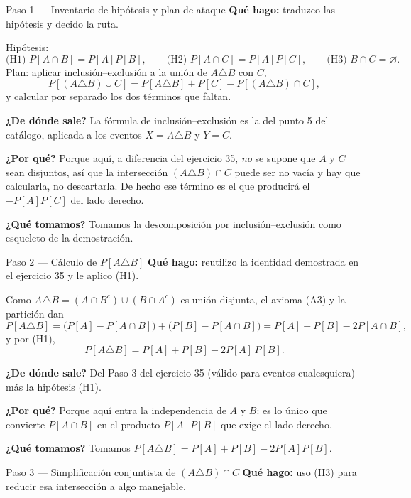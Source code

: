 \documentclass[11pt]{article}
\begin{document}
\begin{sol}

\begin{paso}{Paso 1 --- Inventario de hip\'otesis y plan de ataque}
\textbf{Qu\'e hago:} traduzco las hip\'otesis y decido la ruta.

Hip\'otesis:
\[
\text{(H1) } P[A\cap B]=P[A]P[B],
\qquad
\text{(H2) } P[A\cap C]=P[A]P[C],
\qquad
\text{(H3) } B\cap C=\varnothing .
\]
Plan: aplicar inclusi\'on--exclusi\'on a la uni\'on de $A\triangle B$ con $C$,
\[
P[(A\triangle B)\cup C]=P[A\triangle B]+P[C]-P[(A\triangle B)\cap C],
\]
y calcular por separado los dos t\'erminos que faltan.

\textbf{¿De d\'onde sale?} La f\'ormula de inclusi\'on--exclusi\'on es la del punto 5 del cat\'alogo, aplicada a los eventos $X=A\triangle B$ y $Y=C$.

\textbf{¿Por qu\'e?} Porque aqu\'i, a diferencia del ejercicio 35, \emph{no} se supone que $A$ y $C$ sean disjuntos, as\'i que la intersecci\'on $(A\triangle B)\cap C$ puede ser no vac\'ia y hay que calcularla, no descartarla. De hecho ese t\'ermino es el que producir\'a el $-P[A]P[C]$ del lado derecho.

\textbf{¿Qu\'e tomamos?} Tomamos la descomposici\'on por inclusi\'on--exclusi\'on como esqueleto de la demostraci\'on.
\end{paso}

\begin{paso}{Paso 2 --- C\'alculo de $P[A\triangle B]$}
\textbf{Qu\'e hago:} reutilizo la identidad demostrada en el ejercicio 35 y le aplico (H1).

Como $A\triangle B=(A\cap B^{c})\cup(B\cap A^{c})$ es uni\'on disjunta, el axioma (A3) y la partici\'on dan
\[
P[A\triangle B]=\bigl(P[A]-P[A\cap B]\bigr)+\bigl(P[B]-P[A\cap B]\bigr)=P[A]+P[B]-2P[A\cap B],
\]
y por (H1),
\[
P[A\triangle B]=P[A]+P[B]-2P[A]\,P[B].
\]

\textbf{¿De d\'onde sale?} Del Paso 3 del ejercicio 35 (v\'alido para eventos cualesquiera) m\'as la hip\'otesis (H1).

\textbf{¿Por qu\'e?} Porque aqu\'i entra la independencia de $A$ y $B$: es lo \'unico que convierte $P[A\cap B]$ en el producto $P[A]P[B]$ que exige el lado derecho.

\textbf{¿Qu\'e tomamos?} Tomamos $P[A\triangle B]=P[A]+P[B]-2P[A]P[B]$.
\end{paso}

\begin{paso}{Paso 3 --- Simplificaci\'on conjuntista de $(A\triangle B)\cap C$}
\textbf{Qu\'e hago:} uso (H3) para reducir esa intersecci\'on a algo manejable.


\end{paso}
\end{sol}
\end{document}
